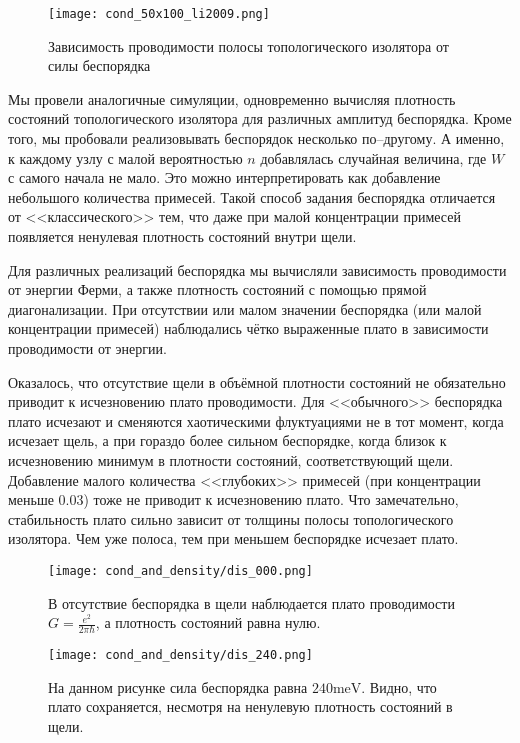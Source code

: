 \begin{figure}[h]
    \centering
    \texttt{[image: cond\_50x100\_li2009.png]}
    \caption{Зависимость проводимости полосы топологического изолятора от силы беспорядка}
    \label{fig:cond_vs_disorder}
\end{figure}


Мы провели аналогичные симуляции, одновременно вычисляя плотность состояний топологического
изолятора для различных амплитуд беспорядка. Кроме того, мы пробовали реализовывать 
беспорядок несколько по--другому. А именно, к каждому узлу с малой 
вероятностью $n$ добавлялась случайная величина, где $W$ с самого начала не мало. Это можно
интерпретировать как добавление небольшого количества примесей. Такой способ задания беспорядка
отличается от <<классического>> тем, что даже при малой концентрации примесей появляется
ненулевая плотность состояний внутри щели. 

Для различных реализаций беспорядка мы вычисляли зависимость проводимости от энергии Ферми, а
также плотность состояний с помощью прямой диагонализации. При отсутствии или малом значении 
беспорядка (или малой концентрации примесей) наблюдались 
чётко выраженные плато в зависимости проводимости от энергии.

Оказалось, что отсутствие щели в объёмной плотности состояний не обязательно приводит 
к исчезновению плато проводимости. Для <<обычного>> беспорядка плато исчезают
и сменяются хаотическими флуктуациями не в тот момент, когда исчезает щель, а при гораздо
более сильном беспорядке, когда близок к исчезновению минимум в плотности состояний,
соответствующий щели. Добавление малого количества <<глубоких>> примесей (при концентрации 
меньше $0.03$) тоже не приводит к исчезновению плато. Что замечательно, стабильность
плато сильно зависит от толщины полосы топологического изолятора. Чем уже полоса, тем 
при меньшем беспорядке исчезает плато. 
\begin{figure}[h]
    \centering
    \texttt{[image: cond\_and\_density/dis\_000.png]}
    \caption{В отсутствие беспорядка 
             в щели наблюдается плато проводимости $G = \frac{e^2}{2\pi\hbar}$, 
             а плотность состояний равна нулю. 
             }
\end{figure}

\begin{figure}[h]
    \centering
    \texttt{[image: cond\_and\_density/dis\_240.png]}
    \caption{На данном рисунке сила беспорядка равна $240 \mathrm{meV}$. Видно, что плато 
             сохраняется, несмотря на ненулевую плотность состояний в щели.}
\end{figure}

